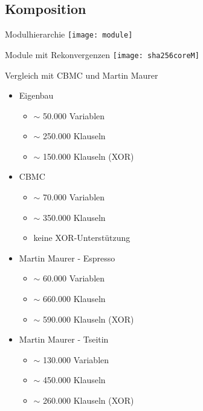 \documentclass{beamer}
\begin{document}
  \subsection{Komposition}
  \begin{frame}{Modulhierarchie}
     \texttt{[image: module]}
  \end{frame}
  \begin{frame}{Module mit Rekonvergenzen}
     \texttt{[image: sha256coreM]}
  \end{frame}  
  \begin{frame}{Vergleich mit CBMC und Martin Maurer}
    \begin{multicols}{2}
      \begin{itemize}
        \setlength{\itemsep}{20pt}
	\item Eigenbau
	\begin{itemize}
	  \item $ \sim $ 50.000 Variablen
	  \item $ \sim $ 250.000 Klauseln
	  \item $ \sim $ 150.000 Klauseln (XOR)
	\end{itemize}
	\item CBMC
	\begin{itemize}
	  \item $ \sim $ 70.000 Variablen
	  \item $ \sim $ 350.000 Klauseln
	  \item keine XOR-Unterstützung
	\end{itemize}
	\item Martin Maurer - Espresso
	\begin{itemize}
	  \item $ \sim $ 60.000 Variablen
	  \item $ \sim $ 660.000 Klauseln
	  \item $ \sim $ 590.000 Klauseln (XOR)
	\end{itemize}
	\item Martin Maurer - Tseitin
	\begin{itemize}
	  \item $ \sim $ 130.000 Variablen
	  \item $ \sim $ 450.000 Klauseln
	  \item $ \sim $ 260.000 Klauseln (XOR)
	\end{itemize}
      \end{itemize}
    \end{multicols}
  \end{frame}
\end{document}
